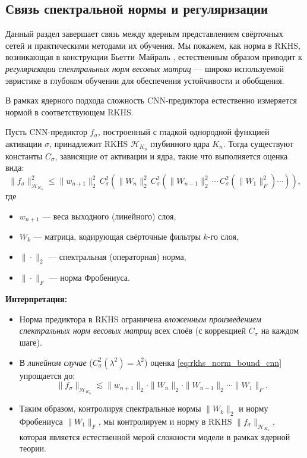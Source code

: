 \documentclass[../NDCNNAI_main.tex]{subfiles}
\begin{document}
\subsection{Связь спектральной нормы и регуляризации}
Данный раздел завершает связь между ядерным представлением свёрточных сетей и практическими методами их обучения. Мы покажем, как норма в RKHS, возникающая в конструкции Бьетти--Майраль \cite{Bietti_Group}, естественным образом приводит к \emph{регуляризации спектральных норм весовых матриц} --- широко используемой эвристике в глубоком обучении для обеспечения устойчивости и обобщения.

В рамках ядерного подхода \cite{Bietti_Group} сложность CNN-предиктора естественно измеряется нормой в соответствующем RKHS.
\begin{proposition}
Пусть CNN-предиктор \( f_\sigma \), построенный с гладкой однородной функцией активации \( \sigma \), принадлежит RKHS \( \mathcal{H}_{K_n} \) глубинного ядра \( K_n \). Тогда существуют константы \( C_\sigma \), зависящие от активации и ядра, такие что выполняется оценка вида:
\begin{equation}
\label{eq:rkhs_norm_bound_cnn}
\| f_\sigma \|^2_{\mathcal{H}_{K_n}} \leq \| w_{n+1} \|_2^2 \, C_\sigma^2\!\left( \| W_n \|_2^2 \, C_\sigma^2\!\left( \| W_{n-1} \|_2^2 \, \cdots \, C_\sigma^2\!\left( \| W_1 \|_F^2 \right) \cdots \right) \right),
\end{equation}
где
\begin{itemize}
    \item \( w_{n+1} \) --- веса выходного (линейного) слоя,
    \item \( W_k \) --- матрица, кодирующая свёрточные фильтры \( k \)-го слоя,
    \item \( \| \cdot \|_2 \) --- спектральная (операторная) норма,
    \item \( \| \cdot \|_F \) --- норма Фробениуса.
\end{itemize}
\end{proposition}

\textbf{Интерпретация:}
\begin{itemize}
    \item Норма предиктора в RKHS ограничена \emph{вложенным произведением спектральных норм весовых матриц} всех слоёв (с коррекцией \( C_\sigma \) на каждом шаге).
    \item В \emph{линейном случае} (\( C_\sigma^2(\lambda^2) = \lambda^2 \)) оценка \eqref{eq:rkhs_norm_bound_cnn} упрощается до:
    \[
    \| f_\sigma \|_{\mathcal{H}_{K_n}} \lesssim \| w_{n+1} \|_2 \cdot \| W_n \|_2 \cdot \| W_{n-1} \|_2 \cdots \| W_1 \|_F.
    \]
    \item Таким образом, контролируя спектральные нормы \( \| W_k \|_2 \) и норму Фробениуса \( \| W_1 \|_F \), мы контролируем и норму в RKHS \( \| f_\sigma \|_{\mathcal{H}_{K_n}} \), которая является естественной мерой сложности модели в рамках ядерной теории.
\end{itemize}
\end{document}
